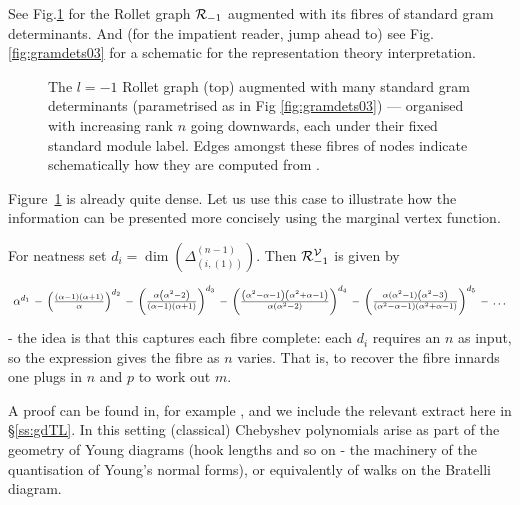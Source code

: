 See Fig.\ref{fig:gramdets0312} for the Rollet graph ${\mathcal{R}}_{-1}$ augmented with its fibres of standard gram determinants.
And 
(for the impatient reader, jump ahead to)
see Fig.\ref{fig:gramdets03} for a schematic for the representation theory interpretation. 

\begin{figure} 

\caption{The $l=-1$ Rollet graph (top) augmented with many standard gram determinants (parametrised as in Fig \ref{fig:gramdets03}) --- organised with increasing rank $n$ going downwards, each under their fixed standard module label. Edges amongst these fibres of nodes indicate schematically how they are computed from \cite{Martin91}. \label{fig:gramdets0312}}
\end{figure}


Figure~\ref{fig:gramdets0312} is already quite dense. Let us use this case to illustrate how the information can be presented more concisely using the marginal vertex function. 




\mdef \label{th:not-main--1}
For neatness set $d_i = \dim(\Delta_{(i,(1))}^{(n-1)})$. 
Then  ${\mathcal{R}}^{{\mathcal V}}_{-1}$ is given by  
\[
\begin{tikzcd}[row sep=tiny,column sep=tiny]
    \a^{d_1}\ar[r,dash]&\left(\frac{(\alpha -1) (\alpha +1)}{\alpha }\right)^{d_2} \ar[r,dash] &
    \left(\frac{\alpha  \left(\alpha ^2-2\right)}{(\alpha -1) (\alpha +1)}\right)^{d_3}\ar[r,dash] &
    \left(\frac{\left(\alpha ^2-\alpha -1\right) \left(\alpha ^2+\alpha -1\right)}{\alpha  \left(\alpha^2 -2\right)}\right)^{d_4} \ar[r,dash] &
    \left(\frac{  %
    \alpha  (\alpha^2 -1) 
    \left(\alpha ^2-3\right)}{\left(\alpha ^2-\alpha -1\right) \left(\alpha ^2+\alpha -1\right)}\right)^{d_5} \ar[r,dash] &
    \dots
\end{tikzcd}
\]
- the idea is that this captures each fibre complete:
each $d_i$ requires an $n$ as input, so the expression gives the fibre as $n$ varies. 
That is, to recover the fibre innards one plugs in $n$ and $p$ to work out $m$.  

A proof can be found in, for example \cite[Ch.10]{paulsonlinelecturenotes}, 
and we include the relevant extract here in \S\ref{ss:gdTL}.  
In this setting (classical) Chebyshev polynomials arise as part of the geometry of Young diagrams (hook lengths and so on - the machinery of the quantisation of Young's normal forms), or equivalently of walks on the Bratelli diagram. 

